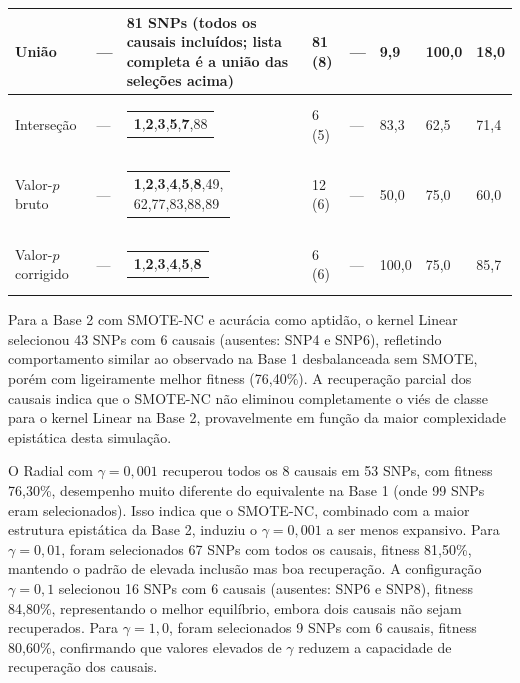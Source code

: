 \documentclass[
    12pt,
    a4paper,
    oneside,
    english,
    french,
    spanish,
    brazil
    ]{abntex2}
\makeatletter
\newcommand{\novo}[1]{\textcolor{corNova}{#1}}
\newcommand{\makecell}[2][t]{\begin{tabular}[#1]{@{}l@{}}#2\end{tabular}}
\makeatother
\begin{document}
\begin{longtable}{L{1.3cm}|L{1.3cm}|C{0.8cm}|L{4.8cm}|C{1.55cm}|C{0.95cm}|C{0.95cm}|C{0.9cm}|C{1.05cm}}
\multicolumn{2}{l|}{\novo{União}} & \novo{---} &
  \novo{81 SNPs (todos os causais incluídos; lista completa é a união das seleções acima)} &
  \novo{81 (8)} & \novo{---} & \novo{9,9} & \novo{100,0} & \novo{18,0} \\
\hline
\multicolumn{2}{l|}{\novo{Interseção}} & \novo{---} &
  \novo{\makecell[l]{\textbf{1},\textbf{2},\textbf{3},\textbf{5},\textbf{7},88}} &
  \novo{6 (5)} & \novo{---} & \novo{83,3} & \novo{62,5} & \novo{71,4} \\
\hline
\multicolumn{2}{l|}{\novo{Valor-$p$ bruto}} & \novo{---} &
  \novo{\makecell[l]{\textbf{1},\textbf{2},\textbf{3},\textbf{4},\textbf{5},\textbf{8},49,\\
               62,77,83,88,89}} &
  \novo{12 (6)} & \novo{---} & \novo{50,0} & \novo{75,0} & \novo{60,0} \\
\hline
\multicolumn{2}{l|}{\novo{Valor-$p$ corrigido}} & \novo{---} &
  \novo{\makecell[l]{\textbf{1},\textbf{2},\textbf{3},\textbf{4},\textbf{5},\textbf{8}}} &
  \novo{6 (6)} & \novo{---} & \novo{100,0} & \novo{75,0} & \novo{85,7} \\
\hline
\end{longtable}



\novo{Para a Base 2 com SMOTE-NC e acurácia como aptidão, o kernel Linear selecionou 43 SNPs com 6 causais (ausentes: SNP4 e SNP6), refletindo comportamento similar ao observado na Base 1 desbalanceada sem SMOTE, porém com ligeiramente melhor fitness (76,40\%). A recuperação parcial dos causais indica que o SMOTE-NC não eliminou completamente o viés de classe para o kernel Linear na Base 2, provavelmente em função da maior complexidade epistática desta simulação.}

\novo{O Radial com $\gamma = 0{,}001$ recuperou todos os 8 causais em 53 SNPs, com fitness 76,30\%, desempenho muito diferente do equivalente na Base 1 (onde 99 SNPs eram selecionados). Isso indica que o SMOTE-NC, combinado com a maior estrutura epistática da Base 2, induziu o $\gamma = 0{,}001$ a ser menos expansivo. Para $\gamma = 0{,}01$, foram selecionados 67 SNPs com todos os causais, fitness 81,50\%, mantendo o padrão de elevada inclusão mas boa recuperação. A configuração $\gamma = 0{,}1$ selecionou 16 SNPs com 6 causais (ausentes: SNP6 e SNP8), fitness 84,80\%, representando o melhor equilíbrio, embora dois causais não sejam recuperados. Para $\gamma = 1{,}0$, foram selecionados 9 SNPs com 6 causais, fitness 80,60\%, confirmando que valores elevados de $\gamma$ reduzem a capacidade de recuperação dos causais.}
\end{document}
